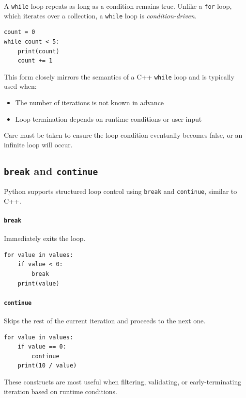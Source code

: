 A \texttt{while} loop repeats as long as a condition remains true. Unlike a \texttt{for} loop, which iterates over a collection, a \texttt{while} loop is \emph{condition-driven}.

\begin{verbatim}
count = 0
while count < 5:
    print(count)
    count += 1
\end{verbatim}

This form closely mirrors the semantics of a C++ \texttt{while} loop and is typically used when:
\begin{itemize}
  \item The number of iterations is not known in advance
  \item Loop termination depends on runtime conditions or user input
\end{itemize}

Care must be taken to ensure the loop condition eventually becomes false, or an infinite loop will occur.

\subsection{\texttt{break} and \texttt{continue}}

Python supports structured loop control using \texttt{break} and \texttt{continue}, similar to C++.

\paragraph{\texttt{break}}
Immediately exits the loop.

\begin{verbatim}
for value in values:
    if value < 0:
        break
    print(value)
\end{verbatim}

\paragraph{\texttt{continue}}
Skips the rest of the current iteration and proceeds to the next one.

\begin{verbatim}
for value in values:
    if value == 0:
        continue
    print(10 / value)
\end{verbatim}

These constructs are most useful when filtering, validating, or early-terminating iteration based on runtime conditions.

